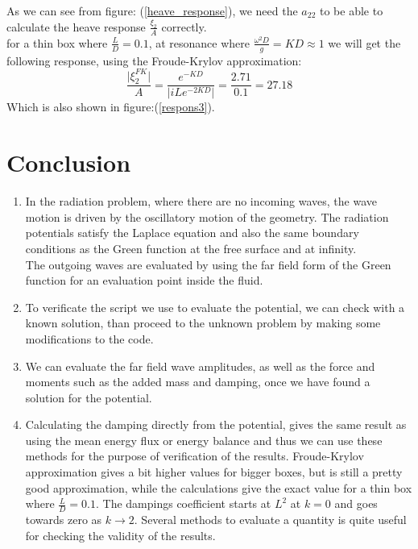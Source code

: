 \documentclass[a4paper,10pt]{article}
\begin{document}
As we can see from figure: (\ref{heave_response}), we need the $a_{22}$ to be able to calculate the heave response $\frac{\xi_2}{A}$ correctly.\\[1em]

for a thin box where $\frac{L}{D}=0.1$, at resonance where $\frac{\omega^2 D}{g} = KD \approx 1$ we will get the following response, using the Froude-Krylov approximation:\\
$$\frac{\vert \xi_2^{FK} \vert}{A} = \frac{e^{-KD}}{\vert i L e^{-2KD} \vert} = \frac{2.71}{0.1} = 27.18$$
Which is also shown in figure:(\ref{respons3}).
\newpage
\section{Conclusion}
\begin{enumerate}
\item In the radiation problem, where there are no incoming waves, the wave motion is driven by the oscillatory motion of the geometry. The radiation potentials satisfy the Laplace equation and also the same boundary conditions as the Green function at the free surface and at infinity.\\
The outgoing waves are evaluated by using the far field form of the Green function for an evaluation point inside the fluid.\\

\item To verificate the script we use to evaluate the potential, we can check with a known solution, than proceed to the unknown problem by making some modifications to the code.

\item We can evaluate the far field wave amplitudes, as well as the force and moments such as the added mass and damping, once we have found a solution for the potential.

\item Calculating the damping directly from the potential, gives the same result as using the mean energy flux or energy balance and thus we can use these methods for the purpose of verification of the results. Froude-Krylov approximation gives a bit higher values for bigger boxes, but is still a pretty good approximation, while the calculations give the exact value for a thin box where $\frac{L}{D}=0.1$. The dampings coefficient starts at $L^2$ at $k=0$ and goes towards zero as $k \rightarrow 2$. Several methods to evaluate a quantity is quite useful for checking the validity of the results.


\end{enumerate}
\end{document}
